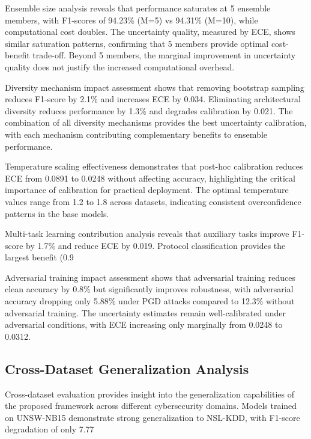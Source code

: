 \documentclass[journal]{IEEEtran}
\begin{document}
Ensemble size analysis reveals that performance saturates at 5 ensemble members, with F1-scores of 94.23\% (M=5) vs 94.31\% (M=10), while computational cost doubles. The uncertainty quality, measured by ECE, shows similar saturation patterns, confirming that 5 members provide optimal cost-benefit trade-off. Beyond 5 members, the marginal improvement in uncertainty quality does not justify the increased computational overhead.

Diversity mechanism impact assessment shows that removing bootstrap sampling reduces F1-score by 2.1\% and increases ECE by 0.034. Eliminating architectural diversity reduces performance by 1.3\% and degrades calibration by 0.021. The combination of all diversity mechanisms provides the best uncertainty calibration, with each mechanism contributing complementary benefits to ensemble performance.

Temperature scaling effectiveness demonstrates that post-hoc calibration reduces ECE from 0.0891 to 0.0248 without affecting accuracy, highlighting the critical importance of calibration for practical deployment. The optimal temperature values range from 1.2 to 1.8 across datasets, indicating consistent overconfidence patterns in the base models.

Multi-task learning contribution analysis reveals that auxiliary tasks improve F1-score by 1.7\% and reduce ECE by 0.019. Protocol classification provides the largest benefit (0.9%

Adversarial training impact assessment shows that adversarial training reduces clean accuracy by 0.8\% but significantly improves robustness, with adversarial accuracy dropping only 5.88\% under PGD attacks compared to 12.3\% without adversarial training. The uncertainty estimates remain well-calibrated under adversarial conditions, with ECE increasing only marginally from 0.0248 to 0.0312.

\subsection{Cross-Dataset Generalization Analysis}

Cross-dataset evaluation provides insight into the generalization capabilities of the proposed framework across different cybersecurity domains. Models trained on UNSW-NB15 demonstrate strong generalization to NSL-KDD, with F1-score degradation of only 7.77%
\end{document}
